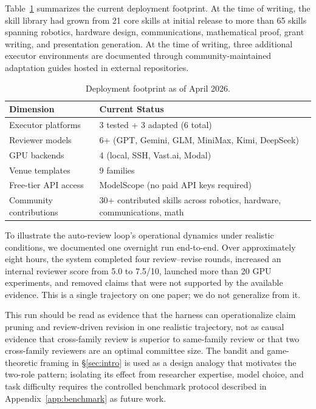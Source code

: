 \documentclass{article}
\theoremstyle{remark}
\begin{document}
Table~\ref{tab:ecosystem} summarizes the current deployment footprint.
At the time of writing, the skill library had grown from 21 core skills at initial release to more than 65 skills spanning robotics, hardware design, communications, mathematical proof, grant writing, and presentation generation.
At the time of writing, three additional executor environments are documented through community-maintained adaptation guides hosted in external repositories.

\begin{table}[t]
\centering
\caption{Deployment footprint as of April 2026.}
\label{tab:ecosystem}
\small
\begin{tabular}{@{}ll@{}}
\toprule
\textbf{Dimension} & \textbf{Current Status} \\
\midrule
Executor platforms & 3 tested + 3 adapted (6 total) \\
Reviewer models & 6+ (GPT, Gemini, GLM, MiniMax, Kimi, DeepSeek) \\
GPU backends & 4 (local, SSH, Vast.ai, Modal) \\
Venue templates & 9 families \\
Free-tier API access & ModelScope (no paid API keys required) \\
Community contributions & 30+ contributed skills across robotics, hardware, communications, math \\
\bottomrule
\end{tabular}
\end{table}

To illustrate the auto-review loop's operational dynamics under realistic conditions, we documented one overnight run end-to-end.
Over approximately eight hours, the system completed four review--revise rounds, increased an internal reviewer score from 5.0 to 7.5/10, launched more than 20 GPU experiments, and removed claims that were not supported by the available evidence.
This is a single trajectory on one paper; we do not generalize from it.

This run should be read as evidence that the harness can operationalize claim pruning and review-driven revision in one realistic trajectory, not as causal evidence that cross-family review is superior to same-family review or that two cross-family reviewers are an optimal committee size.
The bandit and game-theoretic framing in \S\ref{sec:intro} is used as a design analogy that motivates the two-role pattern; isolating its effect from researcher expertise, model choice, and task difficulty requires the controlled benchmark protocol described in Appendix~\ref{app:benchmark} as future work.
\end{document}
